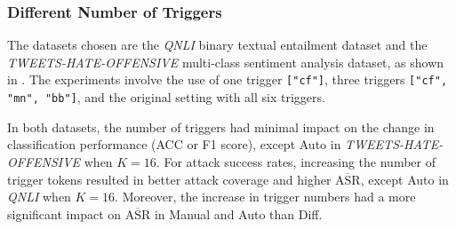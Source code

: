 \subsubsection{Different Number of Triggers}
\vspace{-0.6em}
The datasets chosen are the \textit{QNLI} binary textual entailment dataset and the \textit{TWEETS-HATE-OFFENSIVE} multi-class sentiment analysis dataset, as shown in . The experiments involve the use of one trigger \texttt{["cf"]}, three triggers \texttt{["cf", "mn", "bb"]}, and the original setting with all six triggers.

In both datasets, the number of triggers had minimal impact on the change in classification performance (ACC or F1 score), except Auto in \textit{TWEETS-HATE-OFFENSIVE} when $K = 16$. For attack success rates, increasing the number of trigger tokens resulted in better attack coverage and higher $\overline{\text{ASR}}$, except Auto in \textit{QNLI} when $K = 16$. Moreover, the increase in trigger numbers had a more significant impact on $\overline{\text{ASR}}$ in Manual and Auto than Diff.

